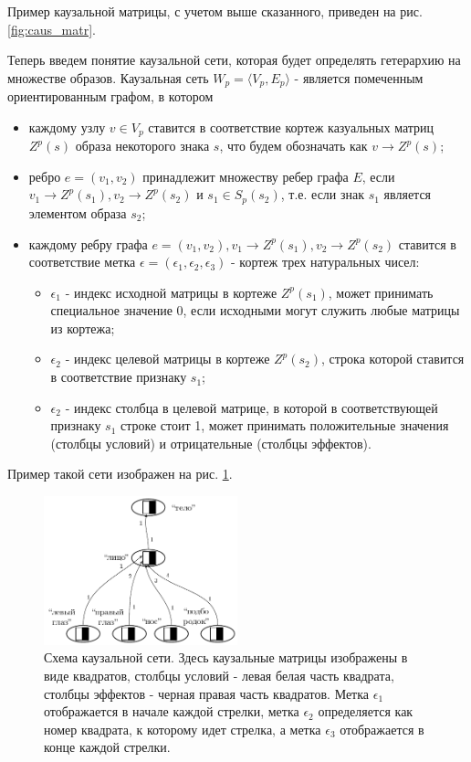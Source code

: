 \documentclass[12pt]{scrartcl}
\begin{document}
	Пример каузальной матрицы, с учетом выше сказанного, приведен на рис. \ref{fig:caus_matr}.
	
	Теперь введем понятие каузальной сети, которая будет определять гетерархию на множестве образов. Каузальная сеть $W_p=\langle V_p, E_p \rangle$ - является помеченным ориентированным графом, в котором
	\begin{itemize}
		\item каждому узлу $v\in V_p$ ставится в соответствие кортеж казуальных матриц $Z^p(s)$ образа некоторого знака $s$, что будем обозначать как $v\rightarrow Z^p(s)$;
		\item ребро $e=(v_1, v_2)$ принадлежит множеству ребер графа $E$, если $v_1\rightarrow Z^p(s_1), v_2\rightarrow Z^p(s_2)$ и $s_1\in S_p(s_2)$, т.е. если знак $s_1$ является элементом образа $s_2$;
		\item каждому ребру графа $e=(v_1, v_2), v_1\rightarrow Z^p(s_1), v_2\rightarrow Z^p(s_2)$ ставится в соответствие метка $\epsilon=(\epsilon_1,\epsilon_2,\epsilon_3)$ - кортеж трех натуральных чисел:
		\begin{itemize}
			\item $\epsilon_1$ - индекс исходной матрицы в кортеже $Z^p(s_1)$, может принимать специальное значение 0, если исходными могут служить любые матрицы из кортежа;
			\item $\epsilon_2$ - индекс целевой матрицы в кортеже $Z^p(s_2)$, строка которой ставится в соответствие признаку $s_1$;
			\item $\epsilon_2$ - индекс столбца в целевой матрице, в которой в соответствующей признаку $s_1$ строке стоит 1, может принимать положительные значения (столбцы условий) и отрицательные (столбцы эффектов).
		\end{itemize}		
	\end{itemize}
	
	Пример такой сети изображен на рис. \ref{fig:caus_net}.

	\begin{figure}[h]
		\centering
		\includegraphics[width=0.5\textwidth]{examples/causnet/caus_net}
		\caption{Схема каузальной сети. Здесь каузальные матрицы изображены в виде квадратов, столбцы условий - левая белая часть квадрата, столбцы эффектов - черная правая часть квадратов. Метка $\epsilon_1$ отображается в начале каждой стрелки, метка $\epsilon_2$ определяется как номер квадрата, к которому идет стрелка, а метка $\epsilon_3$ отображается в конце каждой стрелки.}
		\label{fig:caus_net}		
	\end{figure}
		
\end{document}
